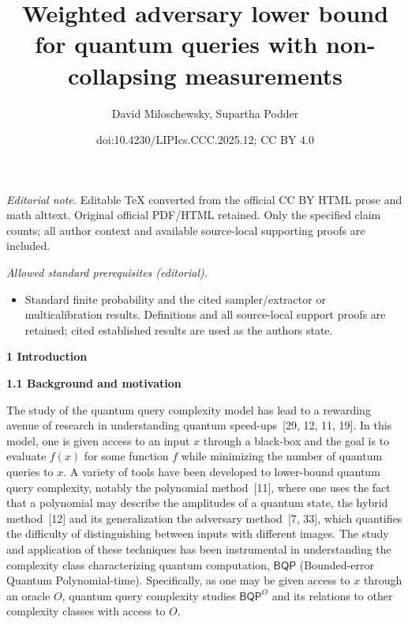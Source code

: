 \documentclass[10pt,a4paper]{article}
\title{Weighted adversary lower bound for quantum queries with non-collapsing measurements}
\author{David Miloschewsky, Supartha Podder}
\date{doi:10.4230/LIPIcs.CCC.2025.12; CC BY 4.0}
\begin{document}
\maketitle
\noindent\textit{Editorial note.} Editable TeX converted from the official CC BY HTML prose and math alttext. Original official PDF/HTML retained. Only the specified claim counts; all author context and available source-local supporting proofs are included.\par\medskip
\noindent\textit{Allowed standard prerequisites (editorial).}\begin{itemize}
\item Standard finite probability and the cited sampler/extractor or multicalibration results. Definitions and all source-local support proofs are retained; cited established results are used as the authors state.
\end{itemize}\medskip


\par\medskip\noindent\textbf{
1 Introduction}\par




\par\medskip\noindent\textbf{
1.1 Background and motivation}\par




The study of the quantum query complexity model has lead to a rewarding avenue of research in understanding quantum speed-ups [29, 12, 11, 19]. In this model, one is given access to an input $x$ through a black-box and the goal is to evaluate $f(x)$ for some function $f$ while minimizing the number of quantum queries to $x$. A variety of tools have been developed to lower-bound quantum query complexity, notably the polynomial method [11], where one uses the fact that a polynomial may describe the amplitudes of a quantum state, the hybrid method [12] and its generalization the adversary method [7, 33], which quantifies the difficulty of distinguishing between inputs with different images. The study and application of these techniques has been instrumental in understanding the complexity class characterizing quantum computation, $\mathsf{BQP}$ (Bounded-error Quantum Polynomial-time). Specifically, as one may be given access to $x$ through an oracle $O$, quantum query complexity studies $\mathsf{BQP}^{O}$ and its relations to other complexity classes with access to $O$.\par
\end{document}
